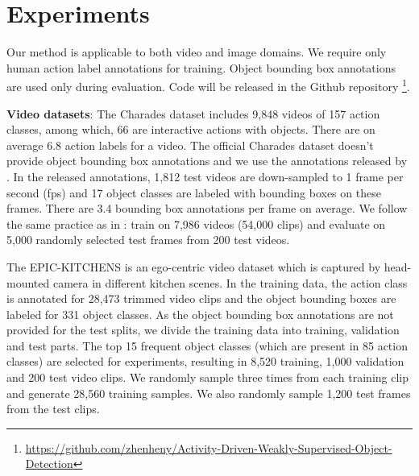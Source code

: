 \documentclass[10pt,twocolumn,letterpaper]{article}
\begin{document}
 \vspace{-0.3\baselineskip}
\section{Experiments}
\vspace{-0.3\baselineskip}
\label{sec:evaluation}

Our method is applicable to both video and image domains. We require only human action label annotations for training. Object bounding box annotations are used only during evaluation. Code will be released in the Github repository \footnote{\url{https://github.com/zhenheny/Activity-Driven-Weakly-Supervised-Object-Detection}}.





 \textbf{Video datasets}: The Charades dataset \cite{sigurdsson2016hollywood} includes 9,848 videos of 157 action classes, among which, 66 are interactive actions with objects. There are on average 6.8 action labels for a video. The official Charades dataset doesn't provide object bounding box annotations and we use the annotations released by \cite{yuan2017temporal}.
In the released annotations, 1,812 test videos are down-sampled to 1 frame per second (fps) and 17 object classes are labeled with bounding boxes on these frames. There are 3.4 bounding box annotations per frame on average. We follow the same practice as in \cite{yuan2017temporal}: train on 7,986 videos (54,000 clips) and evaluate on 5,000 randomly selected test frames from 200 test videos.

The EPIC-KITCHENS \cite{Damen2018EPICKITCHENS} is an ego-centric video dataset which is captured by head-mounted camera in different kitchen scenes. In the training data, the action class is annotated for 28,473 trimmed video clips and the object bounding boxes are labeled for 331 object classes. As the object bounding box annotations are not provided for the test splits, we divide the training data into training, validation and test parts. The top 15 frequent object classes (which are present in 85 action classes) are selected for experiments, resulting in 8,520 training, 1,000 validation and 200 test video clips. We randomly sample three times from each training clip and generate 28,560 training samples. We also randomly sample 1,200 test frames from the test clips.
\end{document}
